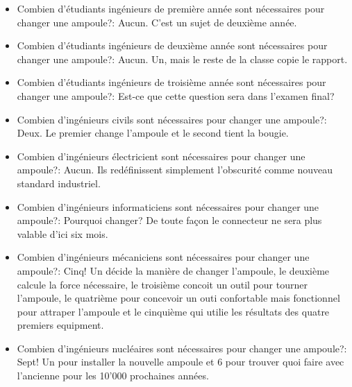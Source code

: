 	\begin{center}\underline{\hspace{5 cm}}\end{center}

\begin{itemize} 
	\item Combien d'étudiants ingénieurs de première année sont nécessaires pour changer une ampoule?: Aucun. C'est un sujet de deuxième année.

	\item  Combien d'étudiants ingénieurs de deuxième année sont nécessaires pour changer une ampoule?: Aucun. Un, mais le reste de la classe copie le rapport.

	\item  Combien d'étudiants ingénieurs de troisième année sont nécessaires pour changer une ampoule?: Est-ce que cette question sera dans l'examen final?

	\item  Combien d'ingénieurs civils sont nécessaires pour changer une ampoule?: Deux. Le premier change l'ampoule et le second tient la bougie.

	\item  Combien d'ingénieurs électricient sont nécessaires pour changer une ampoule?: Aucun. Ils redéfinissent simplement l'obscurité comme nouveau standard industriel.

	\item  Combien d'ingénieurs informaticiens sont nécessaires pour changer une ampoule?: Pourquoi changer? De toute façon le connecteur ne sera plus valable d'ici six mois.

	\item  Combien d'ingénieurs mécaniciens sont nécessaires pour changer une ampoule?: Cinq! Un décide la manière de changer l'ampoule, le deuxième calcule la force nécessaire, le troisième concoit un outil pour tourner l'ampoule, le quatrième pour concevoir un outi confortable mais fonctionnel pour attraper l'ampoule et le cinquième qui utilie les résultats des quatre premiers equipment. 

	\item  Combien d'ingénieurs nucléaires sont nécessaires pour changer une ampoule?: Sept! Un pour installer la nouvelle ampoule et 6 pour trouver quoi faire avec l'ancienne pour les 10'000 prochaines années. 
\end{itemize}

\begin{center}\underline{\hspace{5 cm}}\end{center}

